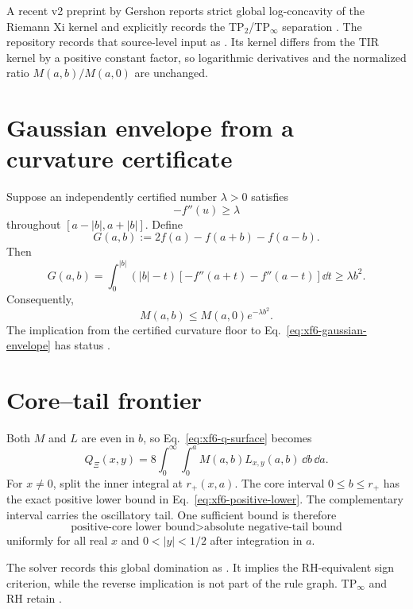 A recent v2 preprint by Gershon reports strict global log-concavity of the Riemann Xi kernel and explicitly records the TP$_2$/TP$_\infty$ separation \cite{Gershon2026LogConcavity}.  The repository records that source-level input as .  Its kernel differs from the TIR kernel by a positive constant factor, so logarithmic derivatives and the normalized ratio $M(a,b)/M(a,0)$ are unchanged.

\section{Gaussian envelope from a curvature certificate}

Suppose an independently certified number $\lambda>0$ satisfies
\[
-f''(u)\ge\lambda
\]
throughout $[a-|b|,a+|b|]$.  Define
\[
G(a,b):=2f(a)-f(a+b)-f(a-b).
\]
Then
\begin{equation}\label{eq:xf6-gap-integral}
G(a,b)
=
\int_0^{|b|}(|b|-t)
\left[-f''(a+t)-f''(a-t)\right]\dd t
\ge\lambda b^2.
\end{equation}
Consequently,
\begin{equation}\label{eq:xf6-gaussian-envelope}
\boxed{
M(a,b)
\le
M(a,0)e^{-\lambda b^2}.
}
\end{equation}
The implication from the certified curvature floor to Eq.~\eqref{eq:xf6-gaussian-envelope} has status .

\section{Core--tail frontier}

Both $M$ and $L$ are even in $b$, so Eq.~\eqref{eq:xf6-q-surface} becomes
\[
Q_\Xi(x,y)
=
8\int_0^\infty\int_0^a M(a,b)L_{x,y}(a,b)\,\dd b\,\dd a.
\]
For $x\neq0$, split the inner integral at $r_+(x,a)$.  The core interval $0\le b\le r_+$ has the exact positive lower bound in Eq.~\eqref{eq:xf6-positive-lower}.  The complementary interval carries the oscillatory tail.  One sufficient bound is therefore
\begin{equation}\label{eq:xf6-core-tail-frontier}
\boxed{
\text{positive-core lower bound}
>
\text{absolute negative-tail bound}
}
\end{equation}
uniformly for all real $x$ and $0<|y|<1/2$ after integration in $a$.

The solver records this global domination as .  It implies the RH-equivalent sign criterion, while the reverse implication is not part of the rule graph. TP$_\infty$ and RH retain .

